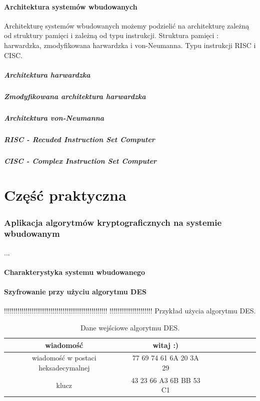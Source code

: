 \documentclass[12p]{article}
\begin{document}
\subsection{Architektura systemów wbudowanych}
\quad Architekturę systemów wbudowanych możemy podzielić na architekturę zależną od struktury pamięci i zależną od typu instrukcji. Struktura pamięci : harwardzka, zmodyfikowana harwardzka i von-Neumanna. Typu instrukcji RISC i CISC.
\subsubsection{Architektura harwardzka}
\subsubsection{Zmodyfikowana architektura harwardzka}
\subsubsection{Architektura von-Neumanna}
\subsubsection{RISC - Recuded Instruction Set Computer}
\subsubsection{CISC - Complex Instruction Set Computer}

\newpage
\part{Część praktyczna}
\section{Aplikacja algorytmów kryptograficznych na systemie wbudowanym}
  ...
\subsection{Charakterystyka systemu wbudowanego}
\subsection{Szyfrowanie przy użyciu algorytmu DES}

!!!!!!!!!!!!!!!!!!!!!!!!!!!!!!!!!!!!!!!!!!!!!!!!!!!!!
!!!!!!!!!!!!!!!!!!!!!!  Przykład użycia algorytmu DES.
 
\begin{table}[H]
\centering
\begin{tabular}{|c|c|c|c|c|c|c|c|c|}
\hline
wiadomość & witaj :)\\
\hline
wiadomość w postaci heksadecymalnej & 77 69 74 61 6A 20 3A 29\\
\hline
klucz & 43 23 66 A3 6B BB 53 C1\\
\hline
\end{tabular}
\caption{Dane wejściowe algorytmu DES.}~\label{binary}
\end{table}
\end{document}
